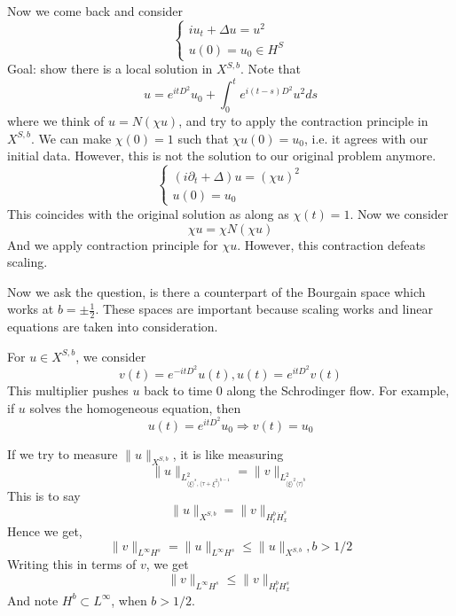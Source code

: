 Now we come back and consider
\begin{equation*}
    \begin{cases}
    iu_t+\Delta u=u^2\\
    u(0)=u_0\in H^S
    \end{cases}
\end{equation*}
Goal: show there is a local solution in $X^{S,b}$. Note that
\begin{equation*}
    u=e^{itD^2}u_0+\int_0^te^{i(t-s)D^2}u^2ds
\end{equation*}
where we think of $u= N(\chi u)$, and try to apply the contraction principle in $X^{S,b}$. We can make $\chi(0)=1$ such that $\chi u(0)=u_0$, i.e. it agrees with our initial data. However, this is not the solution to our original problem anymore.
\begin{equation*}
    \begin{cases}
        (i\partial_t+\Delta)u=(\chi u)^2\\
        u(0)=u_0
    \end{cases}
\end{equation*}
This coincides with the original solution as along as $\chi(t)=1$. Now we consider
\begin{equation*}
    \chi u=\chi N(\chi u)
\end{equation*}
And we apply contraction principle for $\chi u$. However, this contraction defeats scaling. 

Now we ask the question, is there a counterpart of the Bourgain space which works at $b=\pm\frac{1}{2}$. These spaces are important because scaling works and linear equations are taken into consideration.

For $u\in X^{S,b}$, we consider
\begin{equation*}
    v(t)=e^{-itD^2}u(t), u(t)=e^{itD^2}v(t)
\end{equation*}
This multiplier pushes $u$ back to time 0 along the Schrodinger flow. For example, if $u$ solves the homogeneous equation, then
\begin{equation*}
    u(t)=e^{itD^2}u_0\Rightarrow v(t)=u_0
\end{equation*}

If we try to measure $\|u\|_{X^{S,b}}$, it is like measuring 
\begin{equation*}
    \|u\|_{L_{\langle\xi\rangle^s, \langle\tau+\xi^2\rangle^{b-1}}^2}=\|v\|_{L_{\langle \xi\rangle^2\langle \tau\rangle^b}^2}
\end{equation*}
This is to say
\begin{equation*}
    \|u\|_{X^{S,b}}=\|v\|_{H_t^b\dot{H}_x^s}
\end{equation*}
Hence we get,
\begin{equation*}
    \|v\|_{L^\infty H^s}=\|u\|_{L^\infty H^s}\leq\|u\|_{X^{S,b}}, b>1/2
\end{equation*}
Writing this in terms of $v$, we get
\begin{equation*}
    \|v\|_{L^\infty H^s}\leq \|v\|_{H_t^bH_x^s}
\end{equation*}
And note $H^b\subset L^\infty$, when $b>1/2$. 

